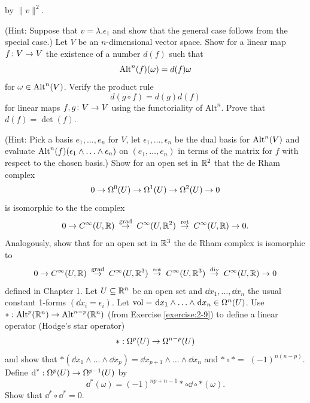 \begin{enumerate}[\theexercise.1]
    by $\|v\|^2$. \par(Hint: Suppose that $v = \lambda.{\epsilon }_{1}$ and show that the general
    case follows from the special case.)
  \NewItem Let $V$ be an $n$-dimensional vector space. Show for a linear map $f\colon V \rightarrow  V$ the existence of a
    number $d( f)$ such that
    \[
      {\operatorname{Alt}}^{n}( f) ( \omega )  = d( f) \omega
    \]
    for $\omega  \in  {\operatorname{Alt}}^{n}( V)$. Verify the product rule
    \[
      d( {g \circ  f})  = d( g) d( f)
    \]
    for linear maps $f,g\colon V \rightarrow  V$ using the functoriality of ${\mathrm{{Alt}}}^{n}$.
    Prove that $d(f)  = \det ( f)$.
    \par(Hint: Pick a basis ${e}_{1},\ldots,{e}_{n}$ for $V$, let ${\epsilon }_{1},\ldots,{\epsilon }_{n}$ be the dual
    basis for ${\operatorname{Alt}}^{n}( V)$ and evaluate ${\operatorname{Alt}}^{n}( f) ( {{\epsilon }_{1} \land  \ldots  \land  {\epsilon }_{n}})$
    on $( {{e}_{1},\ldots,{e}_{n}})$ in terms of the matrix for $f$ with respect to the chosen basis.)
  \newchap[3]
  \NewItem Show for an open set in ${\mathbb{R}}^{2}$ that the de Rham complex
    \[
      0 \rightarrow  {\Omega }^{0}( U)  \rightarrow  {\Omega }^{1}( U)  \rightarrow  {\Omega }^{2}( U)  \rightarrow  0
    \]
    is isomorphic to the the complex
    \[
      0 \rightarrow  {C}^{\infty }( {U,\mathbb{R}}) \overset{\text{ grad }}{ \rightarrow  }{C}^{\infty }( {U,{\mathbb{R}}^{2}}) \overset{\text{ rot }}{ \rightarrow  }{C}^{\infty }( {U,\mathbb{R}})  \rightarrow  0.
    \]
    Analogously, show that for an open set in ${\mathbb{R}}^{3}$ the de Rham complex is isomorphic to
    \[
      0 \rightarrow  {C}^{\infty }( {U,{\mathbb{R}}})
      \overset{\text{ grad }}{ \rightarrow  }{C}^{\infty }( {U,{{\mathbb{R}}}^{3}})
      \overset{\text{ rot }}{ \rightarrow  }{C}^{\infty }( {U,{\mathbb{R}}^{3}})
      \overset{\text{ div }}{ \rightarrow  }{C}^{\infty }( {U,\mathbb{R}})  \rightarrow  0
    \]
    defined in Chapter 1.
  \NewItem Let $U \subseteq  {\ensuremath{\mathbb{R}}}^{n}$ be an open set and $\dd{x}_{1},\ldots,\dd{x}_{n}$ the usual constant 1-forms $( {\dd{x}_{i} = {\epsilon }_{i}})$. Let $\R{vol} = \dd{x}_{1} \land  \ldots  \land  \dd{x}_{n} \in  {\Omega }^{n}( U)$.
    Use $*  : {\operatorname{Alt}}^{p}( {{\mathbb{R}}}^{n})  \rightarrow  {\operatorname{Alt}}^{n- p}( {{\mathbb{R}}}^{n})$ (from Exercise \ref{exercise:2-9}) to define a linear operator (Hodge's star operator)
    \[
      *  : {\Omega }^{p}( U)  \rightarrow  {\Omega }^{n- p}( U)
    \]
    and show that $* ( {\dd{x}_{1} \land  \ldots  \land  \dd{x}_{p}})  = \dd{x}_{p + 1} \land  \ldots  \land  \dd{x}_{n}$ and $*  \circ   *  =$  ${(-1) }^{n( {n- p}) }$. Define ${\dd}^* : {\Omega }^{p}( U)  \ra  {\Omega }^{p- 1}( U)$ by
    \[
      {\dd}^*( \omega )  = {(-1) }^{{np} + n- 1} *  \circ  \dd \circ   * ( \omega ).
    \]
    Show that ${\dd}^* \circ  {\dd}^* = 0$.

\end{enumerate}
